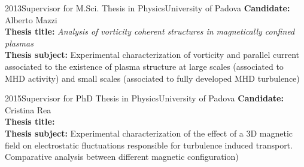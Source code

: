 {\begin{entrylist}
\entry
{2013}{Supervisor for M.Sci. Thesis in Physics}{University of
  Padova}
{ \textbf{Candidate:} Alberto Mazzi \\
\textbf{Thesis title:} \emph{Analysis of vorticity coherent structures
in magnetically confined plasmas} \\
\textbf{Thesis subject:} Experimental characterization of vorticity
and parallel current associated to the existence of plasma structure
at large scales (associated to MHD activity) and small scales
(associated to fully developed MHD turbulence)
}

\entry
{2015}{Supervisor for PhD Thesis in Physics}{University of
  Padova}
{ \textbf{Candidate:} Cristina Rea \\
\textbf{Thesis title:} \emph{} \\
\textbf{Thesis subject:} Experimental characterization of the effect
of a 3D magnetic field on electrostatic fluctuations responsible for
turbulence induced transport. Comparative analysis between different
magnetic configuration)
}

\end{entrylist}
}
